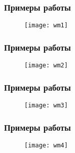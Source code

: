 
\begin{frame}
\frametitle{Примеры работы}

\begin{figure}[h!]
\texttt{[image: wm1]}
\end{figure}

\end{frame}


\begin{frame}
\frametitle{Примеры работы}

\begin{figure}[h!]
\texttt{[image: wm2]}
\end{figure}

\end{frame}


\begin{frame}
\frametitle{Примеры работы}

\begin{figure}[h!]
\texttt{[image: wm3]}
\end{figure}

\end{frame}


\begin{frame}
\frametitle{Примеры работы}

\begin{figure}[h!]
\texttt{[image: wm4]}
\end{figure}

\end{frame}


